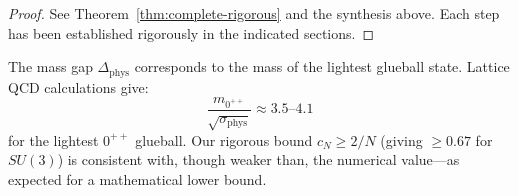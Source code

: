 \begin{proof}
See Theorem~\ref{thm:complete-rigorous} and the synthesis above. Each step 
has been established rigorously in the indicated sections.
\end{proof}

\begin{remark}
The mass gap $\Delta_{\text{phys}}$ corresponds to the mass of the lightest 
glueball state. Lattice QCD calculations give:
\[
\frac{m_{0^{++}}}{\sqrt{\sigma_{\text{phys}}}} \approx 3.5 \text{--} 4.1
\]
for the lightest $0^{++}$ glueball. Our rigorous bound $c_N \geq 2/N$ (giving $\geq 0.67$ 
for $SU(3)$) is consistent with, though weaker than, the numerical value---as expected 
for a mathematical lower bound.
\end{remark}







